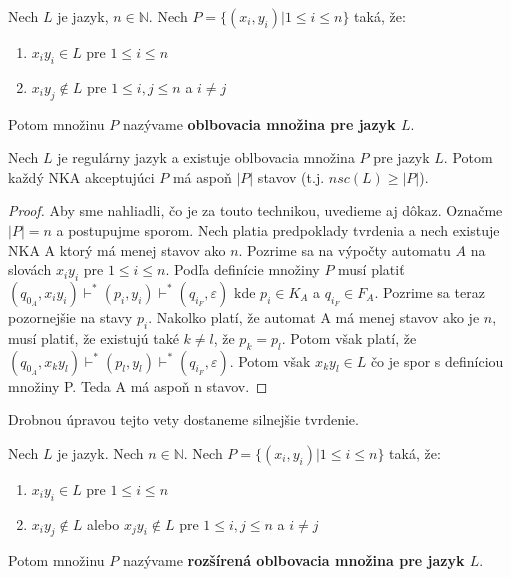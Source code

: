 \begin{definition}
\label{def:fooling_set}
Nech $ L $ je jazyk, $ n \in \mathbb{N} $. Nech $ P = \lbrace (x_{i},y_{i}) | 1 \leq i \leq n \rbrace $ taká, že: 

\begin{enumerate}[label=(\alph*)]
\item $x_{i}y_{i} \in L$ pre $1 \leq i \leq n$
\item $x_{i}y_{j} \notin L$ pre $1 \leq i,j \leq n$ a $i \neq j$
\end{enumerate}

Potom množinu $ P $ nazývame \textbf{oblbovacia množina pre jazyk $ L $}.
\end{definition}

\begin{theorem}
\label{thm:fooling_set_technique}
Nech $ L $ je regulárny jazyk a existuje oblbovacia množina $ P $ pre jazyk $ L $. Potom každý NKA akceptujúci $ P $ má aspoň $ |P| $ stavov (t.j. $ nsc(L) \geq |P| $).
\end{theorem}

\begin{proof}
Aby sme nahliadli, čo je za touto technikou, uvedieme aj dôkaz. Označme $ |P|=n $ a postupujme sporom. Nech platia predpoklady tvrdenia a nech existuje NKA A ktorý má menej stavov ako $ n $. Pozrime sa na výpočty automatu $ A $ na slovách $x_{i}y_{i}$ pre $1 \leq i \leq n$. Podľa definície množiny $ P $ musí platiť $ (q_{0_{A}},x_{i}y_{i}) \vdash^{*} (p_{i}, y_{i}) \vdash^{*} (q_{i_{F}}, \varepsilon) $ kde $p_{i} \in K_{A}$ a $q_{i_{F}} \in F_{A}$. Pozrime sa teraz pozornejšie na stavy $ p_{i} $. Nakolko platí, že automat A má menej stavov ako je $ n $, musí platiť, že existujú také $k \neq l $, že $ p_{k}=p_{l}  $. Potom však platí, že $ (q_{0_{A}},x_{k}y_{l}) \vdash^{*} (p_{l}, y_{l}) \vdash^{*} (q_{i_{F}}, \varepsilon)$. Potom však $x_{k}y_{l} \in L$ čo je spor s definíciou množiny P. Teda A má aspoň n stavov.
\end{proof}

Drobnou úpravou tejto vety dostaneme silnejšie tvrdenie.

\begin{definition}
\label{def:extended_fooling_set}
Nech $ L $ je jazyk. Nech $ n \in \mathbb{N} $. Nech $ P = \lbrace (x_{i},y_{i}) | 1 \leq i \leq n \rbrace $ taká, že: 

\begin{enumerate}[label=(\alph*)]
\item $x_{i}y_{i} \in L$ pre $1 \leq i \leq n$
\item $x_{i}y_{j} \notin L$ alebo $x_{j}y_{i} \notin L$ pre $1 \leq i,j \leq n$ a $i \neq j$
\end{enumerate}

Potom množinu $ P $ nazývame \textbf{rozšírená oblbovacia množina pre jazyk $ L $}.
\end{definition}


